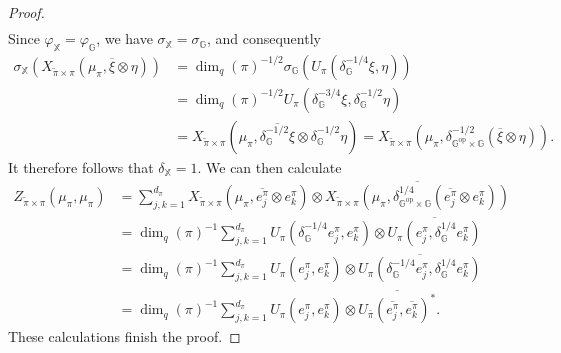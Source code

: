 \documentclass[10pt,a4paper]{amsart}
\newcommand{\G}{\mathbb{G}}
\newcommand{\X}{\mathbb{X}}
\newcommand{\op}{\mathrm{op}}
\begin{document}
\begin{proof}
\begin{align*}
\end{align*}
Since $\varphi_\X= \varphi_\G$, we have $\sigma_\X= \sigma_\G$, and consequently
\begin{align*}
    \sigma_\X(X_{\tilde{\pi}\times \pi}(\mu_\pi, \overline{\xi}\otimes \eta))&= \dim_q(\pi)^{-1/2}\sigma_\G(U_\pi(\delta_\G^{-1/4}\xi, \eta))\\
    &= \dim_q(\pi)^{-1/2}U_\pi(\delta_\G^{-3/4}\xi, \delta_\G^{-1/2}\eta)\\
    &= X_{\tilde{\pi}\times \pi}(\mu_\pi, \overline{\delta_\G^{-1/2}\xi} \otimes \delta_\G^{-1/2}\eta)= X_{\tilde{\pi}\times \pi}(\mu_\pi, \delta_{\G^{\op}\times \G}^{-1/2}(\overline{\xi}\otimes \eta)).
\end{align*}
It therefore follows that $\delta_\X = 1$. We can then calculate
\begin{align*}
    Z_{\tilde{\pi}\times \pi} (\mu_\pi, \mu_\pi)&= \sum_{j,k=1}^{d_\pi} X_{\tilde{\pi}\times\pi}(\mu_\pi, \overline{e_j^\pi}\otimes e_k^\pi)\otimes \overline{X_{\tilde{\pi}\times \pi}(\mu_\pi, \delta_{\G^{\op}\times \G}^{1/4}(\overline{e_j^\pi}\otimes e_k^\pi))}\\
    &= \dim_q(\pi)^{-1} \sum_{j,k=1}^{d_\pi} U_\pi(\delta_\G^{-1/4}e_j^\pi, e_k^\pi)\otimes \overline{U_\pi(e_j^\pi, \delta_\G^{1/4}e_k^\pi)}\\
    &= \dim_q(\pi)^{-1}\sum_{j,k=1}^{d_\pi} U_\pi(e_j^\pi, e_k^\pi) \otimes \overline{U_\pi(\delta_\G^{-1/4}e_j^\pi, \delta_\G^{1/4}e_k^\pi)}\\
    &= \dim_q(\pi)^{-1} \sum_{j,k=1}^{d_\pi} U_\pi(e_j^\pi, e_k^\pi)\otimes \overline{U_{\bar{\pi}}(\overline{e_j^\pi}, \overline{e_k^\pi})^*}.
\end{align*}
These calculations finish the proof.
\end{proof} 
\end{document}
